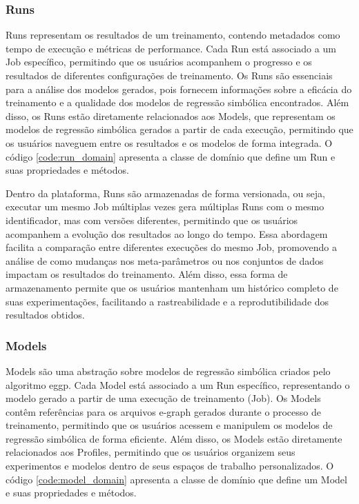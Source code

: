 \subsubsection{Runs}
Runs representam os resultados de um treinamento, contendo metadados como tempo de execução e métricas de performance. Cada Run está associado a um Job específico, permitindo que os usuários acompanhem o progresso e os resultados de diferentes configurações de treinamento. Os Runs são essenciais para a análise dos modelos gerados, pois fornecem informações sobre a eficácia do treinamento e a qualidade dos modelos de regressão simbólica encontrados. Além disso, os Runs estão diretamente relacionados aos Models, que representam os modelos de regressão simbólica gerados a partir de cada execução, permitindo que os usuários naveguem entre os resultados e os modelos de forma integrada. O código \ref{code:run_domain} apresenta a classe de domínio que define um Run e suas propriedades e métodos.

Dentro da plataforma, Runs são armazenadas de forma versionada, ou seja, executar um mesmo Job múltiplas vezes gera múltiplas Runs com o mesmo identificador, mas com versões diferentes, permitindo que os usuários acompanhem a evolução dos resultados ao longo do tempo. Essa abordagem facilita a comparação entre diferentes execuções do mesmo Job, promovendo a análise de como mudanças nos meta-parâmetros ou nos conjuntos de dados impactam os resultados do treinamento. Além disso, essa forma de armazenamento permite que os usuários mantenham um histórico completo de suas experimentações, facilitando a rastreabilidade e a reprodutibilidade dos resultados obtidos.

\subsubsection{Models}
Models são uma abstração sobre modelos de regressão simbólica criados pelo algoritmo eggp. Cada Model está associado a um Run específico, representando o modelo gerado a partir de uma execução de treinamento (Job). Os Models contêm referências para os arquivos e-graph gerados durante o processo de treinamento, permitindo que os usuários acessem e manipulem os modelos de regressão simbólica de forma eficiente. Além disso, os Models estão diretamente relacionados aos Profiles, permitindo que os usuários organizem seus experimentos e modelos dentro de seus espaços de trabalho personalizados. O código \ref{code:model_domain} apresenta a classe de domínio que define um Model e suas propriedades e métodos.

